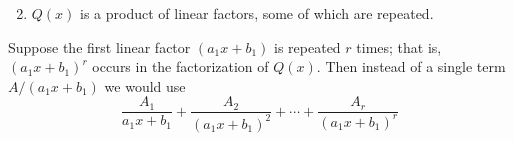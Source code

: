 \begin{frame}
\begin{enumerate}
\setcounter{enumi}{1}
\item  $Q(x)$ is a product of linear factors, some of which are repeated.
\end{enumerate}
Suppose the first linear factor $(a_1x+b_1)$ is repeated $r$ times; that is, $(a_1x+b_1)^r$ occurs in the factorization of $Q(x)$.  Then instead of a single term $A/(a_1x+b_1)$ we would use
\[
\frac{A_1}{a_1x+b_1}%
 + \frac{A_2}{(a_1x+b_1)^2}%
 + \cdots %
 + \frac{A_r}{(a_1x+b_1)^r}%
\]
\end{frame}
